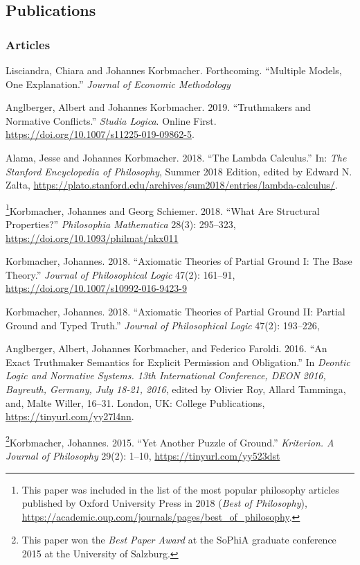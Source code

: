 \subsection*{Publications}
\subsubsection*{Articles}
\begin{etaremune}
  \item Lisciandra, Chiara and Johannes Korbmacher. Forthcoming. ``Multiple Models, One Explanation.'' \emph{Journal of Economic Methodology}
  \item Anglberger, Albert and Johannes Korbmacher. 2019. ``Truthmakers and Normative Conflicts.'' \emph{Studia Logica}. Online First. \url{https://doi.org/10.1007/s11225-019-09862-5}.
  \item Alama, Jesse and Johannes Korbmacher. 2018. ``The Lambda Calculus.'' In: \emph{The Stanford Encyclopedia of Philosophy}, Summer 2018 Edition, edited by Edward N. Zalta, \url{https://plato.stanford.edu/archives/sum2018/entries/lambda-calculus/}.
  \item \footnote{This paper was included in the list of the most popular philosophy articles published by Oxford University Press in 2018 (\emph{Best of Philosophy}), \url{https://academic.oup.com/journals/pages/best_of_philosophy}.}Korbmacher, Johannes and Georg Schiemer. 2018. ``What Are Structural Properties?'' \emph{Philosophia Mathematica} 28(3): 295--323, \url{https://doi.org/10.1093/philmat/nkx011}
  \item Korbmacher, Johannes. 2018. ``Axiomatic Theories of Partial Ground I: The Base Theory.'' \emph{Journal of Philosophical Logic} 47(2): 161--91, \url{https://doi.org/10.1007/s10992-016-9423-9}
  \item Korbmacher, Johannes. 2018. ``Axiomatic Theories of Partial Ground II: Partial Ground and Typed Truth.'' \emph{Journal of Philosophical Logic} 47(2): 193--226,
  \item Anglberger, Albert, Johannes Korbmacher, and Federico Faroldi. 2016. ``An Exact Truthmaker Semantics for Explicit Permission and Obligation.'' In \emph{Deontic Logic and Normative Systems. 13th International Conference, DEON 2016, Bayreuth, Germany, July 18-21, 2016}, edited by Olivier Roy, Allard Tamminga, and, Malte Willer, 16--31. London, UK: College Publications, \url{https://tinyurl.com/yy27l4nn}.
  \item \footnote{This paper won the \emph{Best Paper Award} at the SoPhiA graduate conference 2015 at the University of Salzburg.}Korbmacher, Johannes. 2015. ``Yet Another Puzzle of Ground.'' \emph{Kriterion. A Journal of Philosophy} 29(2): 1--10, \url{https://tinyurl.com/yy523dst}

\end{etaremune}
